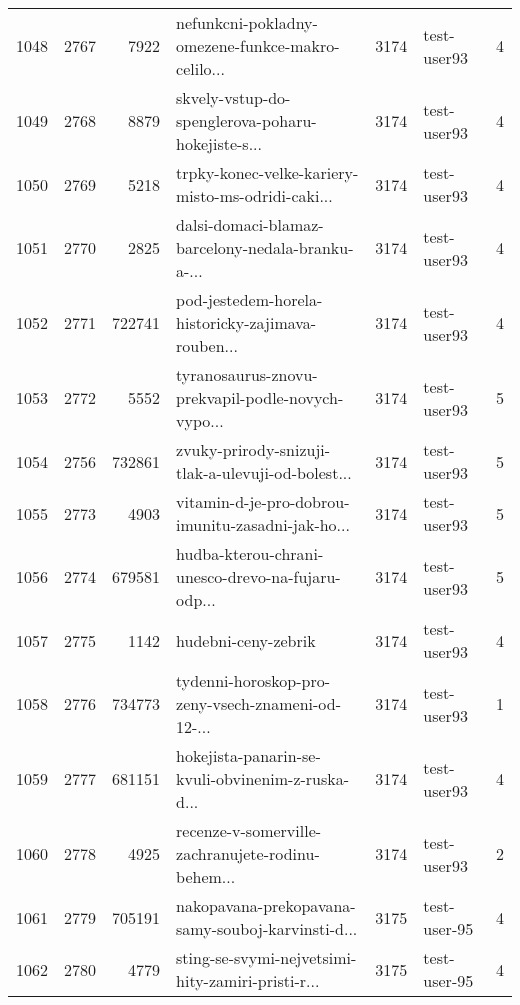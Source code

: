 \begin{tabular}{lrrlrlr}
1048 &       2767 &     7922 &  nefunkcni-pokladny-omezene-funkce-makro-celilo... &     3174 &                  test-user93 &               4 \\
1049 &       2768 &     8879 &  skvely-vstup-do-spenglerova-poharu-hokejiste-s... &     3174 &                  test-user93 &               4 \\
1050 &       2769 &     5218 &  trpky-konec-velke-kariery-misto-ms-odridi-caki... &     3174 &                  test-user93 &               4 \\
1051 &       2770 &     2825 &  dalsi-domaci-blamaz-barcelony-nedala-branku-a-... &     3174 &                  test-user93 &               4 \\
1052 &       2771 &   722741 &  pod-jestedem-horela-historicky-zajimava-rouben... &     3174 &                  test-user93 &               4 \\
1053 &       2772 &     5552 &  tyranosaurus-znovu-prekvapil-podle-novych-vypo... &     3174 &                  test-user93 &               5 \\
1054 &       2756 &   732861 &  zvuky-prirody-snizuji-tlak-a-ulevuji-od-bolest... &     3174 &                  test-user93 &               5 \\
1055 &       2773 &     4903 &  vitamin-d-je-pro-dobrou-imunitu-zasadni-jak-ho... &     3174 &                  test-user93 &               5 \\
1056 &       2774 &   679581 &  hudba-kterou-chrani-unesco-drevo-na-fujaru-odp... &     3174 &                  test-user93 &               5 \\
1057 &       2775 &     1142 &                                hudebni-ceny-zebrik &     3174 &                  test-user93 &               4 \\
1058 &       2776 &   734773 &  tydenni-horoskop-pro-zeny-vsech-znameni-od-12-... &     3174 &                  test-user93 &               1 \\
1059 &       2777 &   681151 &  hokejista-panarin-se-kvuli-obvinenim-z-ruska-d... &     3174 &                  test-user93 &               4 \\
1060 &       2778 &     4925 &  recenze-v-somerville-zachranujete-rodinu-behem... &     3174 &                  test-user93 &               2 \\
1061 &       2779 &   705191 &  nakopavana-prekopavana-samy-souboj-karvinsti-d... &     3175 &                 test-user-95 &               4 \\
1062 &       2780 &     4779 &  sting-se-svymi-nejvetsimi-hity-zamiri-pristi-r... &     3175 &                 test-user-95 &               4 \\

\end{tabular}
